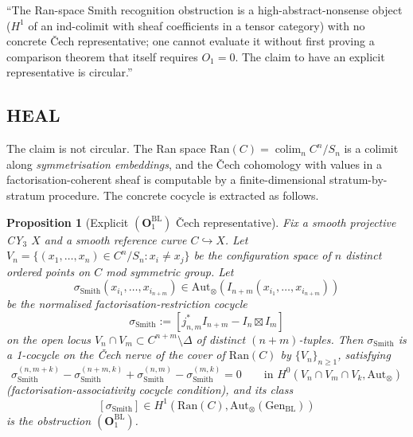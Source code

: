 \documentclass[11pt]{amsart}
\newtheorem{proposition}[theorem]{Proposition}
\newcommand{\Ran}{\mathrm{Ran}}
\newcommand{\Aut}{\mathrm{Aut}}
\newcommand{\Gen}{\mathrm{Gen}}
\DeclareMathOperator{\colim}{colim}
\begin{document}
``The Ran-space Smith recognition obstruction is a high-abstract-nonsense
object ($H^1$ of an ind-colimit with sheaf coefficients in a tensor
category) with no concrete \v{C}ech representative; one cannot evaluate
it without first proving a comparison theorem that itself requires
$O_1 = 0$. The claim to have an explicit representative is circular.''

\subsection*{HEAL}

The claim is not circular. The Ran space $\Ran(C) = \colim_n C^n/S_n$
is a colimit along \emph{symmetrisation embeddings}, and the \v{C}ech
cohomology with values in a factorisation-coherent sheaf is computable
by a finite-dimensional stratum-by-stratum procedure. The concrete
cocycle is extracted as follows.

\begin{proposition}[Explicit $(\mathbf{O}_1^{\mathrm{BL}})$ \v{C}ech
representative]
\label{prop:O1-explicit-cech}
Fix a smooth projective CY$_3$ $X$ and a smooth reference curve
$C \hookrightarrow X$. Let $V_n = \{(x_1, \dots, x_n) \in C^n/S_n :
x_i \neq x_j\}$ be the configuration space of $n$ distinct ordered
points on $C$ mod symmetric group. Let
\[
\sigma_{\mathrm{Smith}}(x_{i_1}, \dots, x_{i_{n+m}}) \in
\Aut_\otimes(I_{n+m}(x_{i_1}, \dots, x_{i_{n+m}}))
\]
be the normalised factorisation-restriction cocycle
\[
\sigma_{\mathrm{Smith}} := [j^*_{n,m} I_{n+m} - I_n \boxtimes I_m]
\]
on the open locus $V_n \cap V_m \subset C^{n+m} \setminus \Delta$ of
distinct $(n+m)$-tuples. Then $\sigma_{\mathrm{Smith}}$ is a 1-cocycle
on the \v{C}ech nerve of the cover of $\Ran(C)$ by
$\{V_n\}_{n \geq 1}$, satisfying
\[
\sigma_{\mathrm{Smith}}^{(n, m+k)}
- \sigma_{\mathrm{Smith}}^{(n+m, k)}
+ \sigma_{\mathrm{Smith}}^{(n, m)}
- \sigma_{\mathrm{Smith}}^{(m, k)} = 0
\qquad \text{in } H^0(V_n \cap V_m \cap V_k, \Aut_\otimes)
\]
(factorisation-associativity cocycle condition), and its class
\[
[\sigma_{\mathrm{Smith}}] \in H^1(\Ran(C), \Aut_\otimes(\Gen_{\mathrm{BL}}))
\]
is the obstruction $(\mathbf{O}_1^{\mathrm{BL}})$.
\end{proposition}
\end{document}
